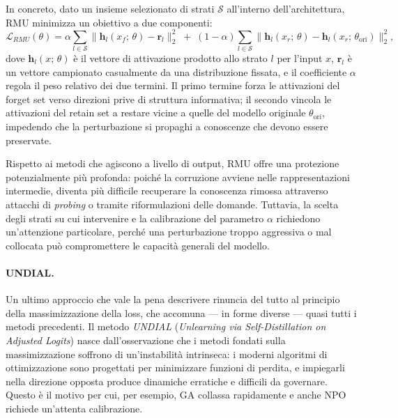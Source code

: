 In concreto, dato un insieme selezionato di strati $\mathcal{S}$ all'interno dell'architettura, RMU minimizza un obiettivo a due componenti:
\begin{equation}
    \mathcal{L}_{RMU}(\theta) = \alpha \sum_{l \in \mathcal{S}} \bigl\|\mathbf{h}_l(x_f;\,\theta) - \mathbf{r}_l\bigr\|^2_2 \;+\; (1-\alpha) \sum_{l \in \mathcal{S}} \bigl\|\mathbf{h}_l(x_r;\,\theta) - \mathbf{h}_l(x_r;\,\theta_{\mathrm{ori}})\bigr\|^2_2,
    \label{eq:rmu}
\end{equation}
dove $\mathbf{h}_l(x;\,\theta)$ è il vettore di attivazione prodotto allo strato $l$ per l'input $x$, $\mathbf{r}_l$ è un vettore campionato casualmente da una distribuzione fissata, e il coefficiente $\alpha$ regola il peso relativo dei due termini. Il primo termine forza le attivazioni del forget set verso direzioni prive di struttura informativa; il secondo vincola le attivazioni del retain set a restare vicine a quelle del modello originale $\theta_{\mathrm{ori}}$, impedendo che la perturbazione si propaghi a conoscenze che devono essere preservate.

Rispetto ai metodi che agiscono a livello di output, RMU offre una protezione potenzialmente più profonda: poiché la corruzione avviene nelle rappresentazioni intermedie, diventa più difficile recuperare la conoscenza rimossa attraverso attacchi di \emph{probing} o tramite riformulazioni delle domande. Tuttavia, la scelta degli strati su cui intervenire e la calibrazione del parametro $\alpha$ richiedono un'attenzione particolare, perché una perturbazione troppo aggressiva o mal collocata può compromettere le capacità generali del modello.

\paragraph{UNDIAL.}
Un ultimo approccio che vale la pena descrivere rinuncia del tutto al principio della massimizzazione della loss, che accomuna — in forme diverse — quasi tutti i metodi precedenti. Il metodo \emph{UNDIAL} (\emph{Unlearning via Self-Distillation on Adjusted Logits}) \cite{dong_undial_2024} nasce dall'osservazione che i metodi fondati sulla massimizzazione soffrono di un'instabilità intrinseca: i moderni algoritmi di ottimizzazione sono progettati per minimizzare funzioni di perdita, e impiegarli nella direzione opposta produce dinamiche erratiche e difficili da governare. Questo è il motivo per cui, per esempio, GA collassa rapidamente e anche NPO richiede un'attenta calibrazione.

